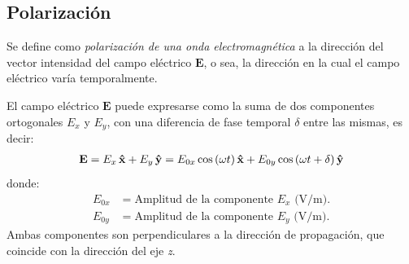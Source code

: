 \subsection{Polarización}
\label{subsec_intro_polar}

Se define como \emph{polarización de una onda electromagnética} a la dirección del vector intensidad del campo eléctrico $\mathbf{E}$, o sea, la dirección en la cual el campo eléctrico varía temporalmente.

El campo eléctrico $\mathbf{E}$ puede expresarse como la suma de dos componentes ortogonales $E_x$ y $E_y$, con una diferencia de fase temporal $\delta$ entre las mismas, es decir:
\begin{align}
\mathbf{E} = E_x\,\bm{\mathbf{\hat{x}}} + E_y\,\bm{\mathbf{\hat{y}}} =  E_{0x}\cos\left(\omega t\right)\bm{\mathbf{\hat{x}}} + E_{0y}\cos\left(\omega t + \delta\right)\bm{\mathbf{\hat{y}}}
\label{ec_intro:71}
\end{align}
donde:
\begin{align*}
E_{0x} &= \text{Amplitud de la componente }E_x\text{ (V/m).}\\
E_{0y} &= \text{Amplitud de la componente }E_y\text{ (V/m).}
\end{align*}
Ambas componentes son perpendiculares a la dirección de propagación, que coincide con la dirección del eje \emph{z}.

